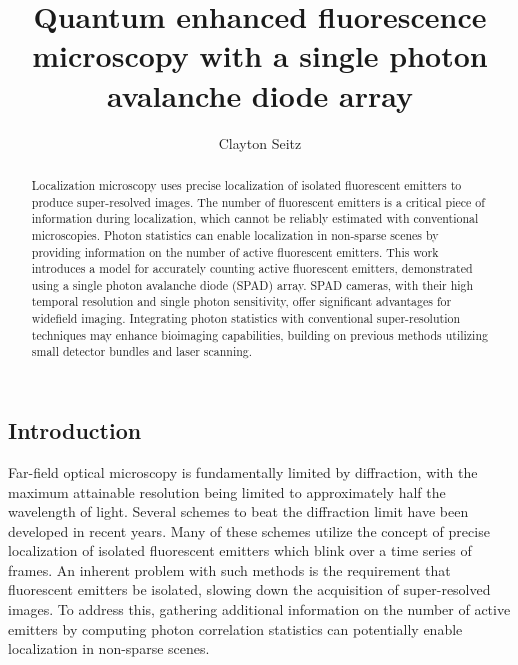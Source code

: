 \documentclass[a4paper, twocolumn, superscriptaddress,prl]{revtex4}  %
\begin{document}
\title{Quantum enhanced fluorescence microscopy with a single photon avalanche diode array}
\author{Clayton Seitz}

\begin{abstract}
Localization microscopy uses precise localization of isolated fluorescent emitters to produce super-resolved images. The number of fluorescent emitters is a critical piece of information during localization, which cannot be reliably estimated with conventional microscopies. Photon statistics can enable localization in non-sparse scenes by providing information on the number of active fluorescent emitters. This work introduces a model for accurately counting active fluorescent emitters, demonstrated using a single photon avalanche diode (SPAD) array. SPAD cameras, with their high temporal resolution and single photon sensitivity, offer significant advantages for widefield imaging. Integrating photon statistics with conventional super-resolution techniques may enhance bioimaging capabilities, building on previous methods utilizing small detector bundles and laser scanning.
\end{abstract}

\maketitle 

\subsection{Introduction}

Far-field optical microscopy is fundamentally limited by diffraction, with the maximum attainable resolution being limited to approximately half the wavelength of light. Several schemes to beat the diffraction limit have been developed in recent years. Many of these schemes utilize the concept of precise localization of isolated fluorescent emitters which blink over a time series of frames. An inherent problem with such methods is the requirement that fluorescent emitters be isolated, slowing down the acquisition of super-resolved images. To address this, gathering additional information on the number of active emitters by computing photon correlation statistics can potentially enable localization in non-sparse scenes. 
\end{document}
